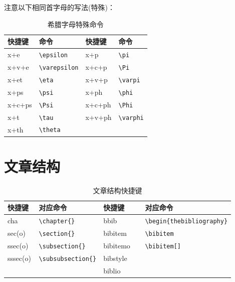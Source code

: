 \documentclass[geye,green,pad,cn]{elegantnote}
\begin{document}
注意以下相同首字母的写法(特殊)：

\begin{table}[htbp]
  \centering
  \caption{希腊字母特殊命令}
    \begin{tabular}{llll}
    \toprule
    快捷键   & 命令    & 快捷键 & 命令 \\
    \midrule
    x+e   & \lstinline|\epsilon| & x+p & \lstinline|\pi| \\
    x+v+e & \lstinline|\varepsilon| & x+c+p & \lstinline|\Pi| \\
    x+et  & \lstinline|\eta| & x+v+p & \lstinline|\varpi| \\
    x+ps  & \lstinline|\psi| & x+ph & \lstinline|\phi| \\
    x+c+ps & \lstinline|\Psi| & x+c+ph & \lstinline|\Phi| \\
    x+t   & \lstinline|\tau| & x+v+ph & \lstinline|\varphi| \\
    x+th  & \lstinline|\theta| &       &  \\
    \bottomrule
    \end{tabular}%
  \label{tab:greek}%
\end{table}%


\section{文章结构}

\begin{table}[htbp]
  \centering
  \caption{文章结构快捷键}
    \begin{tabular}{llll}
    \toprule
    快捷键& 对应命令 & 快捷键 & 对应命令 \\
    \midrule
    cha     & \lstinline|\chapter{}| & bbib    & \lstinline|\begin{thebibliography}| \\
    sec(o) 	& \lstinline|\section{}|    & bibitem    & \lstinline|\bibitem| \\
    ssec(o) & \lstinline|\subsection{}| & bibitemo   & \lstinline|\bibitem[]| \\
    sssec(o)& \lstinline|\subsubsection{}| & bibstyle  & \lstinline|| \\
          &       & biblio     & \lstinline|| \\
    \bottomrule
    \end{tabular}%
  \label{tab:structural}%
\end{table}%
\end{document}
